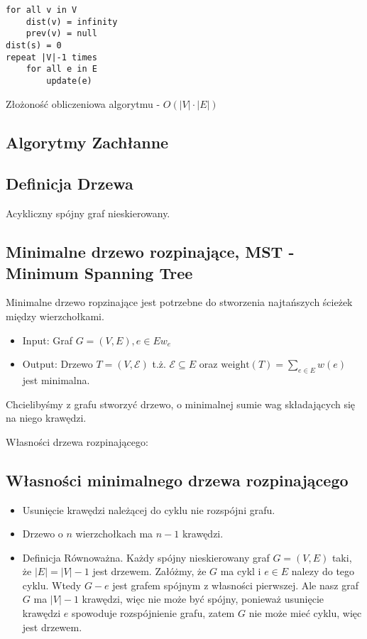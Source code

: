 \documentclass{article}
\numberwithin{equation}{subsection}
\newenvironment{definition}[1]{%
    \trivlist
    \item[\hskip\labelsep\textbf{Definition. #1.}]
    \ignorespaces
}{%
    \endtrivlist
}
\begin{document}
\begin{verbatim}
for all v in V
    dist(v) = infinity
    prev(v) = null
dist(s) = 0
repeat |V|-1 times
    for all e in E
        update(e)
\end{verbatim}

Złożoność obliczeniowa algorytmu - $O(|V|\cdot |E|)$

\subsection{Algorytmy Zachłanne}

\subsection{Definicja Drzewa}

\begin{definition}{Drzewo}
    Acykliczny spójny graf nieskierowany.
\end{definition}

\subsection{Minimalne drzewo rozpinające, MST - Minimum Spanning Tree}

Minimalne drzewo ropzinające jest potrzebne do stworzenia najtańszych ścieżek między wierzchołkami.

\begin{itemize}
    \item Input: Graf $G=(V,E), e\in E w_e$
    \item Output: Drzewo $T=(V,\mathcal{E})$ t.ż. $\mathcal{E}\subseteq E$ oraz $\text{weight}(T)=\sum_{e\in E} w(e)$ jest minimalna.
\end{itemize}

Chcielibyśmy z grafu stworzyć drzewo, o minimalnej sumie wag składających się na niego krawędzi.

Własności drzewa rozpinającego:

\subsection{Własności minimalnego drzewa rozpinającego}

\begin{itemize}
    \item Usunięcie krawędzi należącej do cyklu nie rozspójni grafu.
    \item Drzewo o $n$ wierzchołkach ma $n-1$ krawędzi.
    \item Definicja Równoważna. Każdy spójny nieskierowany graf $G=(V,E)$ taki, że $|E|=|V|-1$ jest drzewem.
    Załóżmy, że $G$ ma cykl i $e\in E$ nalezy do tego cyklu. Wtedy $G-e$ jest grafem spójnym z własności pierwszej. Ale nasz graf 
    $G$ ma $|V|-1$ krawędzi, więc nie może być spójny, ponieważ usunięcie krawędzi $e$ spowoduje rozspójnienie grafu, zatem
    $G$ nie może mieć cyklu, więc jest drzewem.
\end{itemize}
\end{document}
